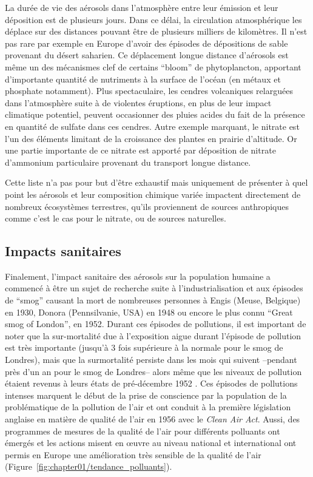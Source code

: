 La durée de vie des aérosols dans l'atmosphère entre leur émission et leur déposition est
de plusieurs jours. Dans ce délai, la circulation atmosphérique les déplace sur des
distances pouvant être de plusieurs milliers de kilomètres. Il n'est pas rare par exemple en
Europe d'avoir des épisodes de dépositions de sable provenant du désert saharien. Ce
déplacement longue distance d'aérosols est même un des mécanismes clef de certains ``bloom''
de phytoplancton, apportant d'importante quantité de nutriments à la surface de l'océan (en
métaux et phosphate notamment).
Plus spectaculaire, les cendres volcaniques relarguées dans l'atmosphère suite à de
violentes éruptions, en plus de leur impact climatique potentiel, peuvent occasionner des
pluies acides du fait de la présence en quantité de sulfate dans ces cendres.
Autre exemple marquant, le nitrate est l'un des éléments limitant de la croissance des
plantes en prairie d'altitude. Or une partie importante de ce nitrate est apporté par
déposition de nitrate d'ammonium particulaire provenant du transport longue distance.

Cette liste n'a pas pour but d'être exhaustif mais uniquement de présenter à quel point
les aérosols et leur composition chimique variée impactent directement de nombreux
écosystèmes terrestres, qu'ils proviennent de sources anthropiques comme c'est le cas pour le
nitrate, ou de sources naturelles.

\subsection{Impacts sanitaires}%
\label{sub:impacts_sanitaires}

Finalement, l'impact sanitaire des aérosols sur la population humaine a commencé à être
un sujet de recherche suite à l'industrialisation et aux épisodes de ``smog'' causant la
mort de nombreuses personnes à Engis (Meuse, Belgique) en 1930, Donora (Pennsilvanie, USA)
en 1948 ou encore le plus connu ``Great smog of London'', en 1952. Durant ces épisodes de
pollutions, il est important de noter que la sur-mortalité due à l'exposition aigue
durant l'épisode de pollution est très importante (jusqu'à 3 fois supérieure à la normale
pour le smog de Londres), mais que la surmortalité persiste dans les mois qui suivent
--pendant près d'un an pour le smog de Londres-- alors même que les niveaux de pollution
étaient revenus à leurs états de pré-décembre 1952 \autocite{bellReassessment2001}.  Ces
épisodes de pollutions intenses marquent le début de la prise de conscience par la
population de la problématique de la pollution de l'air et ont conduit à la première
législation anglaise en matière de qualité de l'air en 1956 avec le \textit{Clean Air
Act}. Aussi, des programmes de mesures de la qualité de l'air pour différents polluants
ont émergés et les actions misent en œuvre au niveau national et international ont permis
en Europe une amélioration très sensible de la qualité de l'air
(Figure~\ref{fig:chapter01/tendance_polluants}).

